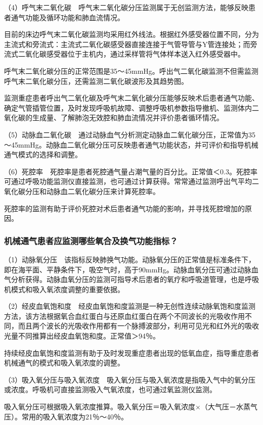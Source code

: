 （4）呼气末二氧化碳　呼气末二氧化碳分压监测属于无创监测方法，能够反映患者通气功能及循环功能和肺血流情况。

目前的床边呼气末二氧化碳监测均采用红外线法。根据红外感受器位置不同，分为主流式和旁流式：主流式二氧化碳感受器直接连接于气管导管与Y管连接处；而旁流式二氧化碳感受器位于主机内，通过采样管将气体样本送入红外感受器中。

呼气末二氧化碳分压的正常范围是35～45mmHg。呼出气二氧化碳监测不但需监测呼气末二氧化碳分压，还需监测二氧化碳波形及其趋势图。

监测重症患者呼出气二氧化碳及呼气末二氧化碳分压能够反映术后患者通气功能、确定气管插管位置，及时发现呼吸机故障、调整呼吸机参数指导撤机、监测体内二氧化碳的生成量、了解肺泡无效腔和肺血流情况并评价患者循环情况。

（5）动脉血二氧化碳　通过动脉血气分析测定动脉血二氧化碳分压，正常值为35～45mmHg。动脉血二氧化碳分压可反映患者通气功能状态，并可评价和指导机械通气模式的选择和调整。

（6）死腔率　死腔率是患者死腔通气量占潮气量的百分比。正常值＜0.3。死腔率可通过呼吸功能监测仪直接监测，也可通过计算获得。常常通过监测呼出气平均二氧化碳分压和动脉血二氧化碳分压来计算死腔率。

死腔率的监测有助于评价死腔对术后患者通气功能的影响，并寻找死腔增加的原因。

\subsubsection{机械通气患者应监测哪些氧合及换气功能指标？}

（1）动脉氧分压　该指标反映肺换气功能。动脉氧分压的正常值是标准条件下，即在海平面、平静条件下，吸空气时，高于90mmHg。动脉血氧分压可通过动脉血气分析获得。动脉血氧分压的监测可指导术后患者的氧疗和呼吸道管理，也是呼吸机模式和吸入氧浓度调整的重要依据。

（2）经皮血氧饱和度　经皮血氧饱和度监测是一种无创性连续动脉氧饱和度监测方法，该方法根据氧合血红蛋白与还原血红蛋白在两个不同波长的光吸收作用不同，而且两个波长的光吸收作用都有一个脉搏波部分，利用可见光和红外光的吸收光量不同推算出经皮血氧饱和度。正常值＞94％。

持续经皮血氧饱和度监测有助于及时发现重症患者出现的低氧血症，指导重症患者机械通气的模式和吸入氧浓度的调整。

（3）吸入氧分压与吸入氧浓度　吸入氧分压与吸入氧浓度是指吸入气中的氧分压或浓度。呼吸机可直接监测吸入气氧浓度，也可通过氧监测仪监测。

吸入氧分压可根据吸入氧浓度推算。吸入氧分压＝吸入氧浓度×（大气压－水蒸气压）。常用的吸入氧浓度为21％～40％。

